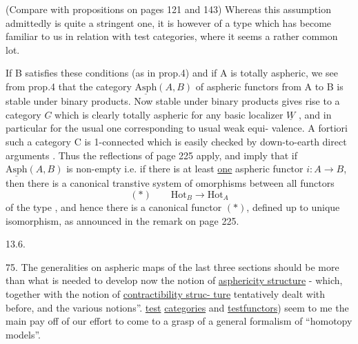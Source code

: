 
(Compare with propositions on pages 121 and 143) Whereas this  assumption
admittedly is quite a stringent one, it is however of a type which has
become familiar to us in relation with test categories, where it seems a
rather common lot.

If B satisfies these conditions (as in prop.4) and if A is totally
aspheric, we see from prop.4 that the category $\underline{\mathrm{Asph}}(A,B)$ of aspheric
functors from A to B is stable under binary products. Now 
 stable under binary products gives rise to a
category $C\hat{}$ which is clearly totally aspheric for any basic localizer $\underline{W}$ ,
and in particular for the usual one  corresponding to usual weak equi-%
valence. A fortiori such a category C  is 1-connected \hand{$\leftarrow$} \hand{(}which is easily
checked  by down-to-earth direct arguments\hand{)} . Thus the reflections of
page 225 apply, and imply that if $\underline{\mathrm{Asph}}(A,B)$ is non-empty i.e. if there
is at least \uline{one} aspheric functor $i\colon A\longrightarrow B$, then there is a canonical
transtive system of omorphisms between all functors
\[ (\ast) \qquad \mathrm{Hot}_B \longrightarrow \mathrm{Hot}_A \]
 of the type , and hence there is a canonical functor $(\ast)$, defined up
to unique isomorphism, as announced in the remark on page 225.

13.6.

75. The generalities on aspheric maps of the last three sections should
be more than what is needed to develop now the notion of \uline{asphericity
structure} - which, \unsure{\hand{,}}together with the  notion of \uline{contractibility struc-%
ture}\hand{,} tentatively dealt with before, and the various notions''\hand{(}. \uline{test}
 \uline{categories} and \uline{testfunctors}) seem to me  the main
pay off   of our effort to come to a grasp of a general formalism
of ``homotopy models''.

